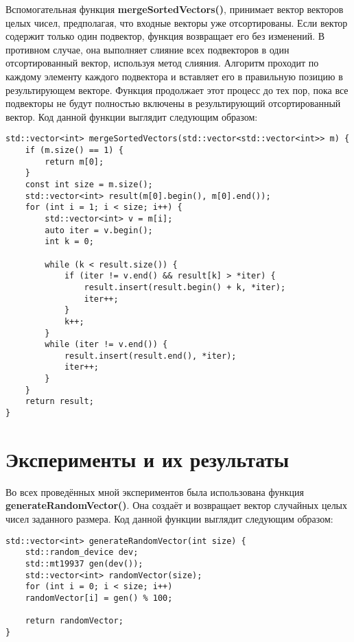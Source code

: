 \documentclass[a4paper, 14pt]{article}
\theoremstyle{plain}
\begin{document}
Вспомогательная функция \textbf{mergeSortedVectors()}, принимает вектор векторов целых чисел, предполагая, что входные векторы уже отсортированы. Если вектор содержит только один подвектор, функция возвращает его без изменений. В противном случае, она выполняет слияние всех подвекторов в один отсортированный вектор, используя метод слияния. Алгоритм проходит по каждому элементу каждого подвектора и вставляет его в правильную позицию в результирующем векторе. Функция продолжает этот процесс до тех пор, пока все подвекторы не будут полностью включены в результирующий отсортированный вектор. Код данной функции выглядит следующим образом:
\vspace{-1.9em}
\begin{verbatim}
std::vector<int> mergeSortedVectors(std::vector<std::vector<int>> m) {
	if (m.size() == 1) {
		return m[0];
	}
	const int size = m.size();
	std::vector<int> result(m[0].begin(), m[0].end());
	for (int i = 1; i < size; i++) {
		std::vector<int> v = m[i];
		auto iter = v.begin();
		int k = 0;
		
		while (k < result.size()) {
			if (iter != v.end() && result[k] > *iter) {
				result.insert(result.begin() + k, *iter);
				iter++;
			}
			k++;
		}
		while (iter != v.end()) {
			result.insert(result.end(), *iter);
			iter++;
		}
	}
	return result;
}
\end{verbatim}
\newpage
\section*{\centering Эксперименты и их результаты}

Во всех проведённых мной экспериментов была использована функция \textbf{generateRandomVector()}. Она создаёт и возвращает вектор случайных целых чисел заданного размера. Код данной функции выглядит следующим образом:
\vspace{-1.9em}
\begin{verbatim}
std::vector<int> generateRandomVector(int size) {
	std::random_device dev;
	std::mt19937 gen(dev());
	std::vector<int> randomVector(size);
	for (int i = 0; i < size; i++)
	randomVector[i] = gen() % 100;
	
	return randomVector;
}
\end{verbatim}
\end{document}
